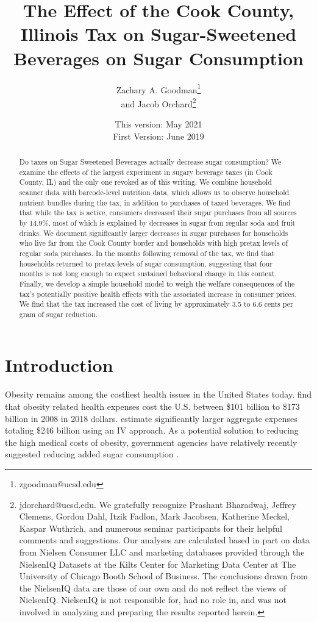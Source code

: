 \documentclass[12pt]{article}
\title{The Effect of the Cook County, Illinois Tax on Sugar-Sweetened Beverages on Sugar Consumption}
\author{Zachary A. Goodman\thanks{zgoodman@ucsd.edu}\\ and Jacob Orchard\thanks{jdorchard@ucsd.edu. We gratefully recognize Prashant Bharadwaj, Jeffrey Clemens, Gordon Dahl, Itzik Fadlon, Mark Jacobsen, Katherine Meckel, Kaspar Wuthrich, and numerous seminar participants for their helpful comments and suggestions. Our analyses are calculated based in part on data from Nielsen Consumer LLC and marketing databases provided through the NielsenIQ Datasets at the Kilts Center for Marketing Data Center at The University of Chicago Booth School of Business. The conclusions drawn from the NielsenIQ data are those of our own and do not reflect the views of NielsenIQ. NielsenIQ is not responsible for, had no role in, and was not involved in analyzing and preparing the results reported herein.}}
\affil{University of California, San Diego}
\date{This version: May 2021\\
First Version: June 2019}
\begin{document}
\maketitle

\begin{abstract}

Do taxes on Sugar Sweetened Beverages actually decrease sugar consumption? We examine the effects of the largest experiment in sugary beverage taxes (in Cook County, IL) and the only one revoked as of this writing. We combine household scanner data with barcode-level nutrition data, which allows us to observe household nutrient bundles during the tax, in addition to purchases of taxed beverages. We find that while the tax is active, consumers decreased their sugar purchases from all sources by 14.9\%, most of which is explained by decreases in sugar from regular soda and fruit drinks. We document significantly larger decreases in sugar purchases for households who live far from the Cook County border and households with high pretax levels of regular soda purchases. In the months following removal of the tax, we find that households returned to pretax-levels of sugar consumption, suggesting that four months is not long enough to expect sustained behavioral change in this context. Finally, we develop a simple household model to weigh the welfare consequences of the tax's potentially positive health effects with the associated increase in consumer prices. We find that the tax increased the cost of living by approximately 3.5 to 6.6 cents per gram of sugar reduction.
\end{abstract}

\pagebreak

\doublespacing

\section{Introduction} \label{introduction}

Obesity remains among the costliest health issues in the United States today. \textcite{finkelstein2009annual} find that obesity related health expenses cost the U.S. between \$101 billion to \$173 billion in 2008 in 2018 dollars. \textcite{cawley2012medical} estimate significantly larger aggregate expenses totaling \$246 billion using an IV approach. As a potential solution to reducing the high medical costs of obesity, government agencies have relatively recently suggested reducing added sugar consumption \parencite{dietary2015dietary}.
\end{document}
